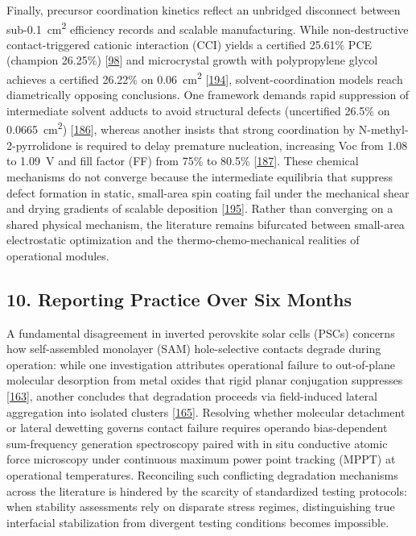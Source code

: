 \documentclass[
  11pt,
]{article}
\begin{document}
Finally, precursor coordination kinetics reflect an unbridged disconnect
between sub-\qty{0.1}{\centi\meter\squared} efficiency records and
scalable manufacturing. While non-destructive contact-triggered cationic
interaction (CCI) yields a certified 25.61\% PCE (champion 26.25\%)
{[}\href{https://doi.org/10.1038/s41560-026-02027-4}{98}{]} and
microcrystal growth with polypropylene glycol achieves a certified
26.22\% on \qty{0.06}{\centi\meter\squared}
{[}\href{https://doi.org/10.1002/adma.202522508}{194}{]},
solvent-coordination models reach diametrically opposing conclusions.
One framework demands rapid suppression of intermediate solvent adducts
to avoid structural defects (uncertified 26.5\% on
\qty{0.0665}{\centi\meter\squared})
{[}\href{https://doi.org/10.1038/s41467-026-68439-8}{186}{]}, whereas
another insists that strong coordination by N-methyl-2-pyrrolidone is
required to delay premature nucleation, increasing Voc from 1.08 to
\qty{1.09}{\volt} and fill factor (FF) from 75\% to 80.5\%
{[}\href{https://doi.org/10.1063/5.0297564}{187}{]}. These chemical
mechanisms do not converge because the intermediate equilibria that
suppress defect formation in static, small-area spin coating fail under
the mechanical shear and drying gradients of scalable deposition
{[}\href{https://doi.org/10.20517/ss.2025.128}{195}{]}. Rather than
converging on a shared physical mechanism, the literature remains
bifurcated between small-area electrostatic optimization and the
thermo-chemo-mechanical realities of operational modules.

\subsection{10. Reporting Practice Over Six
Months}\label{reporting-practice-over-six-months}

A fundamental disagreement in inverted perovskite solar cells (PSCs)
concerns how self-assembled monolayer (SAM) hole-selective contacts
degrade during operation: while one investigation attributes operational
failure to out-of-plane molecular desorption from metal oxides that
rigid planar conjugation suppresses
{[}\href{https://doi.org/10.1016/j.scib.2026.02.050}{163}{]}, another
concludes that degradation proceeds via field-induced lateral
aggregation into isolated clusters
{[}\href{https://doi.org/10.1038/s41467-026-72097-1}{165}{]}. Resolving
whether molecular detachment or lateral dewetting governs contact
failure requires operando bias-dependent sum-frequency generation
spectroscopy paired with in situ conductive atomic force microscopy
under continuous maximum power point tracking (MPPT) at operational
temperatures. Reconciling such conflicting degradation mechanisms across
the literature is hindered by the scarcity of standardized testing
protocols: when stability assessments rely on disparate stress regimes,
distinguishing true interfacial stabilization from divergent testing
conditions becomes impossible.
\end{document}
